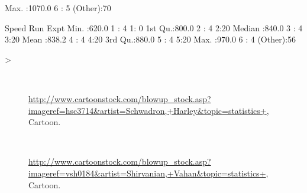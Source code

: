 \documentclass[12pt,letterpaper,final]{article}
\begin{document}
\begin{Schunk}
\begin{Soutput}
 Max.   :1070.0   6      : 5         
                  (Other):70         
\end{Soutput}
\begin{Soutput}
     Speed            Run     Expt  
 Min.   :620.0   1      : 4   1: 0  
 1st Qu.:800.0   2      : 4   2:20  
 Median :840.0   3      : 4   3:20  
 Mean   :838.2   4      : 4   4:20  
 3rd Qu.:880.0   5      : 4   5:20  
 Max.   :970.0   6      : 4         
                 (Other):56         
\end{Soutput}
\begin{Sinput}
> 
\end{Sinput}
\end{Schunk}


\newpage


~\\[2cm]


\begin{figure}[ht]
\caption{\label{Cartoonstock_ArtistRetreat}
\url{http://www.cartoonstock.com/blowup_stock.asp?imageref=hsc3714&artist=Schwadron,+Harley&topic=statistics+},
Cartoon.
}
\end{figure}


\newpage

%


\setcounter{page}{1}




\vspace*{1cm}

~\\[1cm]

\begin{figure}[ht]
\caption{\label{Cartoonstock_FallingArrow}
\url{http://www.cartoonstock.com/blowup_stock.asp?imageref=vsh0184&artist=Shirvanian,+Vahan&topic=statistics+}, 
Cartoon.
}
\end{figure}
\end{document}
